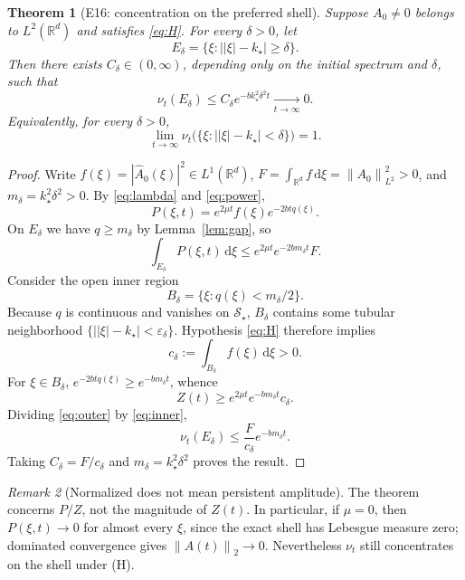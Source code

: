 \documentclass[11pt]{article}
\newtheorem{theorem}{Theorem}[section]
\theoremstyle{remark}
\newtheorem{remark}[theorem]{Remark}
\newcommand{\R}{\mathbb R}
\newcommand{\Sstar}{\mathcal S_\star}
\newcommand{\abs}[1]{\left\lvert#1\right\rvert}
\newcommand{\norm}[1]{\left\lVert#1\right\rVert}
\newcommand{\dd}{\,\mathrm d}
\begin{document}
\begin{theorem}[E16: concentration on the preferred shell]
\label{thm:concentration}
Suppose $A_0\ne0$ belongs to $L^2(\R^d)$ and satisfies
\eqref{eq:H}. For every $\delta>0$, let
\[
 E_\delta=\{\xi:\lvert\abs\xi-k_\star\rvert\ge\delta\}.
\]
Then there exists $C_\delta\in(0,\infty)$, depending only on the
initial spectrum and $\delta$, such that
\begin{equation}\label{eq:concentration}
 \boxed{\displaystyle
 \nu_t(E_\delta)
 \le C_\delta e^{-bk_\star^2\delta^2t}
 \xrightarrow[t\to\infty]{}0.}
\end{equation}
Equivalently, for every $\delta>0$,
\[
 \lim_{t\to\infty}
 \nu_t\bigl(\{\xi:\lvert\abs\xi-k_\star\rvert<\delta\}\bigr)
 =1.
\]
\end{theorem}
\begin{proof}
Write
$f(\xi)=\abs{\widehat A_0(\xi)}^2\in L^1(\R^d)$,
$F=\int_{\R^d}f\dd\xi=\norm{A_0}_{L^2}^2>0$, and
$m_\delta=k_\star^2\delta^2>0$.
By \eqref{eq:lambda} and \eqref{eq:power},
\begin{equation}\label{eq:P-factor}
 P(\xi,t)=e^{2\mu t}f(\xi)e^{-2btq(\xi)}.
\end{equation}
On $E_\delta$ we have $q\ge m_\delta$ by
Lemma~\ref{lem:gap}, so
\begin{equation}\label{eq:outer}
 \int_{E_\delta}P(\xi,t)\dd\xi
 \le e^{2\mu t}e^{-2bm_\delta t}F.
\end{equation}
Consider the open inner region
\[
 B_\delta=\{\xi:q(\xi)<m_\delta/2\}.
\]
Because $q$ is continuous and vanishes on $\Sstar$,
$B_\delta$ contains some tubular neighborhood
$\{\lvert\abs\xi-k_\star\rvert<\varepsilon_\delta\}$.
Hypothesis \eqref{eq:H} therefore implies
\[
 c_\delta:=\int_{B_\delta}f(\xi)\dd\xi>0.
\]
For $\xi\in B_\delta$, $e^{-2btq(\xi)}\ge e^{-bm_\delta t}$,
whence
\begin{equation}\label{eq:inner}
 Z(t)\ge e^{2\mu t}e^{-bm_\delta t}c_\delta.
\end{equation}
Dividing \eqref{eq:outer} by \eqref{eq:inner},
\[
 \nu_t(E_\delta)
 \le\frac{F}{c_\delta}e^{-bm_\delta t}.
\]
Taking $C_\delta=F/c_\delta$ and
$m_\delta=k_\star^2\delta^2$ proves the result.
\end{proof}

\begin{remark}[Normalized does not mean persistent amplitude]
The theorem concerns $P/Z$, not the magnitude of $Z(t)$.
In particular, if $\mu=0$, then $P(\xi,t)\to0$ for almost
every $\xi$, since the exact shell has Lebesgue measure zero;
dominated convergence gives $\norm{A(t)}_2\to0$.
Nevertheless $\nu_t$ still concentrates on the shell under (H).
\end{remark}
\end{document}
